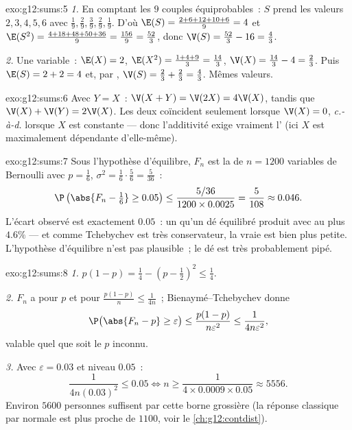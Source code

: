 \begin{solution}{exo:g12:sums:5}
\emph{1.} En comptant les $9$ couples équiprobables~: $S$ prend les
valeurs $2, 3, 4, 5, 6$ avec 
$\frac19, \frac29, \frac39, \frac29, \frac19$. D'où
$\E(S) = \frac{2 + 6 + 12 + 10 + 6}{9} = 4$ et
$\E(S^2) = \frac{4 + 18 + 48 + 50 + 36}{9} = \frac{156}{9} = \frac{52}{3}$,
donc $\V(S) = \frac{52}{3} - 16 = \frac43$.

\emph{2.} Une variable~: $\E(X) = 2$,
$\E(X^2) = \frac{1 + 4 + 9}{3} = \frac{14}{3}$,
$\V(X) = \frac{14}{3} - 4 = \frac23$. Puis $\E(S) = 2 + 2 = 4$ et, par
, $\V(S) = \frac23 + \frac23 = \frac43$. Mêmes valeurs.
\end{solution}

\begin{solution}{exo:g12:sums:6}
Avec $Y = X$~: $\V(X + Y) = \V(2X) = 4\V(X)$, tandis que
$\V(X) + \V(Y) = 2\V(X)$. Les deux coïncident seulement lorsque
$\V(X) = 0$, \emph{c.-à-d.} lorsque $X$ est constante --- donc
l'additivité exige vraiment l' (ici $X$ est maximalement
dépendante d'elle-même).
\end{solution}

\begin{solution}{exo:g12:sums:7}
Sous l'hypothèse d'équilibre, $F_n$ est la  de $n = 1200$ variables
de Bernoulli avec $p = \frac16$,
$\sigma^2 = \frac16\cdot\frac56 = \frac{5}{36}$~:
\[
\P\left(\abs{F_n - \tfrac16} \geq 0.05\right)
\leq \frac{5/36}{1200 \times 0.0025} = \frac{5}{108} \approx 0.046 .
\]
L'écart observé est exactement $0.05$~: un  qu'un dé équilibré
produit avec  au plus $4.6\%$ --- et comme Tchebychev est très
conservateur, la vraie  est bien plus petite. L'hypothèse
d'équilibre n'est pas plausible~; le dé est très probablement pipé.
\end{solution}

\begin{solution}{exo:g12:sums:8}
\emph{1.} $p(1-p) = \frac14 - \left(p - \frac12\right)^2 \leq \frac14$.

\emph{2.} $F_n$ a pour  $p$ et pour 
$\frac{p(1-p)}{n} \leq \frac{1}{4n}$~; Bienaymé--Tchebychev donne
\[
\P\bigl(\abs{F_n - p} \geq \varepsilon\bigr)
\leq \frac{p(1-p)}{n\varepsilon^2} \leq \frac{1}{4n\varepsilon^2},
\]
valable quel que soit le $p$ inconnu.

\emph{3.} Avec $\varepsilon = 0.03$ et niveau $0.05$~:
\[
\frac{1}{4n(0.03)^2} \leq 0.05
\iff n \geq \frac{1}{4 \times 0.0009 \times 0.05} \approx 5556 .
\]
Environ $5600$ personnes suffisent par cette borne grossière (la réponse
classique par  normale est plus proche de $1100$, voir le
\cref{ch:g12:contdist}).
\end{solution}

